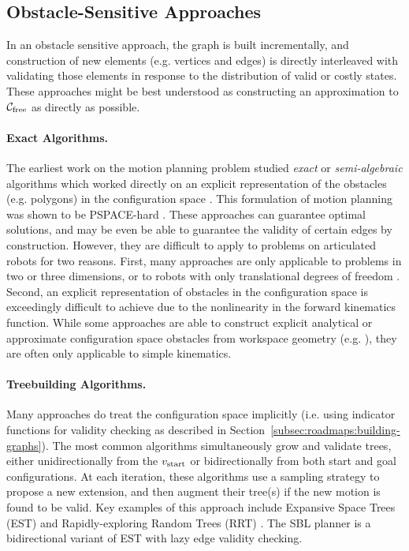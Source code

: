 \subsection{Obstacle-Sensitive Approaches}
\label{subsec:roadmaps:sensitive}

In an obstacle sensitive approach,
the graph is built incrementally,
and construction of new elements (e.g. vertices and edges)
is directly interleaved with validating those elements
in response to the distribution of valid or costly states.
These approaches might be best understood
as constructing an approximation to $\mathcal{C}_{\mbox{\scriptsize free}}$
as directly as possible.

\paragraph{Exact Algorithms.}
The earliest work on the motion planning problem studied
\emph{exact} or \emph{semi-algebraic}
algorithms which worked directly on an explicit representation
of the obstacles (e.g. polygons) in the configuration space
\citep{lozanoperez1983cspace}.
This formulation of motion planning was shown to be
PSPACE-hard \citep{reif1979moverscomplexity,canny1988complexitymotionplanning}.
These approaches can guarantee optimal solutions,
and may be even be able to guarantee the validity of certain edges
by construction.
However,
they are difficult to apply to problems on articulated
robots for two reasons.
First, many approaches are only applicable to problems
in two or three dimensions,
or to robots with only translational degrees of freedom
\citep{kavraki1995cspacefft}.
Second, an explicit representation of obstacles in the
configuration space is exceedingly difficult to achieve due to the
nonlinearity in the forward kinematics function.
While some approaches are able to construct explicit
analytical or approximate configuration space obstacles from
workspace geometry (e.g. \citep{newmanbranicky1991cspacetransforms}),
they are often only applicable to simple kinematics.

\paragraph{Treebuilding Algorithms.}
Many approaches do treat the configuration space implicitly
(i.e. using indicator functions for validity checking as described
in Section~\ref{subsec:roadmaps:building-graphs}).
The most common algorithms simultaneously grow and validate trees,
either unidirectionally from the $v_{\mbox{\scriptsize start}}$ or bidirectionally
from both start and goal configurations.
At each iteration,
these algorithms use a sampling strategy to propose a new extension,
and then augment their tree(s) if the new motion is found to be valid.
Key examples of this approach include
Expansive Space Trees (EST) \citep{hsu1997expansive}
and Rapidly-exploring Random Trees (RRT)
\citep{lavalle1998rrt, kuffner2000rrtconnect}.
The SBL planner \citep{sanchezante2001sbl}
is a bidirectional variant of EST with lazy edge validity checking.

